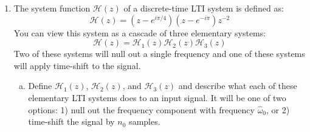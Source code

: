 \begin{enumerate}
\begin{marginfigure}
\begin{center}
          \end{center}
          \caption{A cascade of three elementary LTI systems defined by system functions $\mathcal{H}_1(z)$, $\mathcal{H}_2(z)$ and $\mathcal{H}_3(z)$ is equivalent to a single LTI system $\mathcal{H}(z)=\mathcal{H}_1(z)\mathcal{H}_2(z)\mathcal{H}_3(z)$.}
          \label{fig:cascade_z_ex}
        \end{marginfigure}

  \item The system function $\mathcal{H}(z)$ of a discrete-time LTI system is defined as:
        \begin{equation}
          \mathcal{H}(z) = (z-e^{i\pi/4})(z-e^{-i\pi})z^{-2}
        \end{equation}
        You can view this system as a cascade of three elementary systems:
        \begin{equation}
          \mathcal{H}(z) = \mathcal{H}_1(z)\mathcal{H}_2(z)\mathcal{H}_3(z)
        \end{equation}
        Two of these systems will null out a single frequency and one of these systems will apply time-shift to the signal.

        \begin{enumerate}[a)]
          \item Define $\mathcal{H}_1(z)$, $\mathcal{H}_2(z)$, and $\mathcal{H}_3(z)$ and describe what each of these elementary LTI systems does to an input signal. It will be one of two options: 1) null out the frequency component with frequency $\hat{\omega}_0$, or 2) time-shift the signal by $n_0$ samples.


\end{enumerate}
\end{enumerate}
